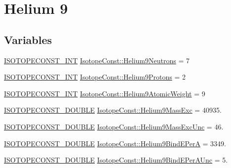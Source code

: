 \hypertarget{group___isotope_const-_helium-_he9}{}\section{Helium 9}
\label{group___isotope_const-_helium-_he9}
\subsection*{Variables}
\begin{DoxyCompactItemize}
\item 
\mbox{\hyperlink{group___isotope_const-_macros_ga5f18360b3e99483a35c32d789e62621c}{I\+S\+O\+T\+O\+P\+E\+C\+O\+N\+S\+T\+\_\+\+I\+NT}} \mbox{\hyperlink{group___isotope_const-_helium-_he9_gaf1a0855e01916583ba06edc48597557f}{Isotope\+Const\+::\+Helium9\+Neutrons}} = 7
\item 
\mbox{\hyperlink{group___isotope_const-_macros_ga5f18360b3e99483a35c32d789e62621c}{I\+S\+O\+T\+O\+P\+E\+C\+O\+N\+S\+T\+\_\+\+I\+NT}} \mbox{\hyperlink{group___isotope_const-_helium-_he9_ga243a15e5fe696f45073827dbe43d85a4}{Isotope\+Const\+::\+Helium9\+Protons}} = 2
\item 
\mbox{\hyperlink{group___isotope_const-_macros_ga5f18360b3e99483a35c32d789e62621c}{I\+S\+O\+T\+O\+P\+E\+C\+O\+N\+S\+T\+\_\+\+I\+NT}} \mbox{\hyperlink{group___isotope_const-_helium-_he9_ga535bbec4b979be492d664d698eecff00}{Isotope\+Const\+::\+Helium9\+Atomic\+Weight}} = 9
\item 
\mbox{\hyperlink{group___isotope_const-_macros_ga8f45a7272ce02c0b4c65c44636ed719a}{I\+S\+O\+T\+O\+P\+E\+C\+O\+N\+S\+T\+\_\+\+D\+O\+U\+B\+LE}} \mbox{\hyperlink{group___isotope_const-_helium-_he9_ga22a71e282e5b7140585fbf88d10b64b7}{Isotope\+Const\+::\+Helium9\+Mass\+Exc}} = 40935.
\item 
\mbox{\hyperlink{group___isotope_const-_macros_ga8f45a7272ce02c0b4c65c44636ed719a}{I\+S\+O\+T\+O\+P\+E\+C\+O\+N\+S\+T\+\_\+\+D\+O\+U\+B\+LE}} \mbox{\hyperlink{group___isotope_const-_helium-_he9_ga41341d24e74cf4cfd9d870eabb0935f3}{Isotope\+Const\+::\+Helium9\+Mass\+Exc\+Unc}} = 46.
\item 
\mbox{\hyperlink{group___isotope_const-_macros_ga8f45a7272ce02c0b4c65c44636ed719a}{I\+S\+O\+T\+O\+P\+E\+C\+O\+N\+S\+T\+\_\+\+D\+O\+U\+B\+LE}} \mbox{\hyperlink{group___isotope_const-_helium-_he9_ga576c43bd65e96ba7d5cce052113aee91}{Isotope\+Const\+::\+Helium9\+Bind\+E\+PerA}} = 3349.
\item 
\mbox{\hyperlink{group___isotope_const-_macros_ga8f45a7272ce02c0b4c65c44636ed719a}{I\+S\+O\+T\+O\+P\+E\+C\+O\+N\+S\+T\+\_\+\+D\+O\+U\+B\+LE}} \mbox{\hyperlink{group___isotope_const-_helium-_he9_ga2a83285801fcc98bb19cb62c8fb93713}{Isotope\+Const\+::\+Helium9\+Bind\+E\+Per\+A\+Unc}} = 5.

\end{DoxyCompactItemize}

